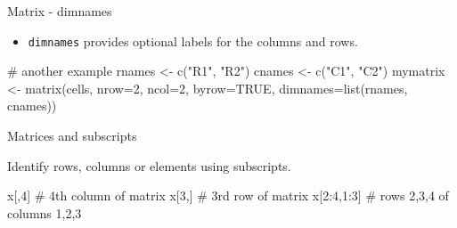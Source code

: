 \documentclass[
  10pt,
  ignorenonframetext,
]{beamer}
\newenvironment{Shaded}{\begin{snugshade}}{\end{snugshade}}
\newcommand{\CommentTok}[1]{\textcolor[rgb]{0.50,0.62,0.50}{#1}}
\newcommand{\DataTypeTok}[1]{\textcolor[rgb]{0.87,0.87,0.75}{#1}}
\newcommand{\DecValTok}[1]{\textcolor[rgb]{0.86,0.86,0.80}{#1}}
\newcommand{\KeywordTok}[1]{\textcolor[rgb]{0.94,0.87,0.69}{#1}}
\newcommand{\NormalTok}[1]{\textcolor[rgb]{0.80,0.80,0.80}{#1}}
\newcommand{\OperatorTok}[1]{\textcolor[rgb]{0.94,0.94,0.82}{#1}}
\newcommand{\OtherTok}[1]{\textcolor[rgb]{0.94,0.94,0.56}{#1}}
\newcommand{\StringTok}[1]{\textcolor[rgb]{0.80,0.58,0.58}{#1}}
\providecommand{\tightlist}{%
  \setlength{\itemsep}{0pt}\setlength{\parskip}{0pt}}
\begin{document}
\begin{frame}[fragile]{Matrix - dimnames}
\protect\hypertarget{matrix---dimnames}{}

\begin{itemize}
\tightlist
\item
  \texttt{dimnames} provides optional labels for the columns and rows.
\end{itemize}

\begin{Shaded}
\begin{Highlighting}[]
\CommentTok{# another example}
\NormalTok{rnames <-}\StringTok{ }\KeywordTok{c}\NormalTok{(}\StringTok{"R1"}\NormalTok{, }\StringTok{"R2"}\NormalTok{)}
\NormalTok{cnames <-}\StringTok{ }\KeywordTok{c}\NormalTok{(}\StringTok{"C1"}\NormalTok{, }\StringTok{"C2"}\NormalTok{)}
\NormalTok{mymatrix <-}\StringTok{ }\KeywordTok{matrix}\NormalTok{(cells, }\DataTypeTok{nrow=}\DecValTok{2}\NormalTok{, }\DataTypeTok{ncol=}\DecValTok{2}\NormalTok{, }\DataTypeTok{byrow=}\OtherTok{TRUE}\NormalTok{,}
  \DataTypeTok{dimnames=}\KeywordTok{list}\NormalTok{(rnames, cnames)) }
\end{Highlighting}
\end{Shaded}

\end{frame}

\begin{frame}[fragile]{Matrices and subscripts}
\protect\hypertarget{matrices-and-subscripts}{}

Identify rows, columns or elements using subscripts.

\begin{Shaded}
\begin{Highlighting}[]
\NormalTok{x[,}\DecValTok{4}\NormalTok{] }\CommentTok{# 4th column of matrix}
\NormalTok{x[}\DecValTok{3}\NormalTok{,] }\CommentTok{# 3rd row of matrix}
\NormalTok{x[}\DecValTok{2}\OperatorTok{:}\DecValTok{4}\NormalTok{,}\DecValTok{1}\OperatorTok{:}\DecValTok{3}\NormalTok{] }\CommentTok{# rows 2,3,4 of columns 1,2,3 }
\end{Highlighting}
\end{Shaded}

\end{frame}
\end{document}

